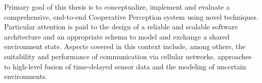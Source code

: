 Primary goal of this thesis is to conceptualize, implement and evaluate a comprehensive, end-to-end Cooperative Perception system using novel techniques. Particular attention is paid to the design of a reliable and scalable software architecture and an appropriate schema to model and exchange a shared environment state. Aspects covered in this context include, among others, the suitability and performance of communication via cellular networks, approaches to high-level fusion of time-delayed sensor data and the modeling of uncertain environments. 
